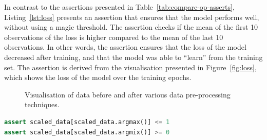 \documentclass[conference]{IEEEtran}
\begin{document}
In contrast to the assertions presented in Table~\ref{tab:compare-op-asserts}, Listing~\ref{lst:loss} presents an assertion that ensures that the model performs well, without using a magic threshold. The assertion checks if the mean of the first 10 observations of the loss is higher compared to the mean of the last 10 observations. In other words, the assertion ensures that the loss of the model decreased after training, and that the model was able to ``learn'' from the training set. The assertion is derived from the visualisation presented in Figure~\ref{fig:loss}, which shows the loss of the model over the training epochs.

\begin{figure}
  \caption{Visualisation of data before and after various data pre-processing techniques.}
  \label{fig:data-pre-process}
\end{figure}

\begin{lstlisting}[language=Python, caption={Assertion to check that the mix and max of a feature fall within specified threshold derived from the visualisation presented in Figure~\ref{fig:scale}.}, label={lst:scale}]
assert scaled_data[scaled_data.argmax()] <= 1
assert scaled_data[scaled_data.argmix()] >= 0
\end{lstlisting}
\end{document}
